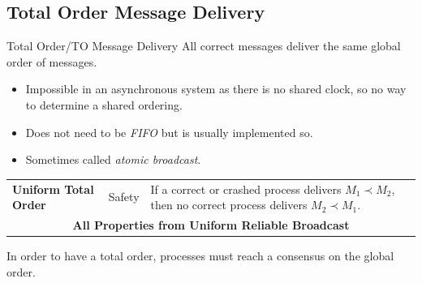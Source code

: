 \inputminted{elixir}{broadcast/code/causal_reliable_broadcast_vector_clock.ex}

\subsection{Total Order Message Delivery}
\begin{definitionbox}{Total Order/TO Message Delivery}
    All correct messages deliver the same global order of messages.
    \begin{itemize}
        \item Impossible in an asynchronous system as there is no shared clock, so no way to determine a shared ordering. 
        \item Does not need to be \textit{FIFO} but is usually implemented so.
        \item Sometimes called \textit{atomic broadcast}.
    \end{itemize}
    \begin{center}
        \begin{tabular}{l l p{}}
            \textbf{Uniform Total Order} & Safety & If a correct or crashed process delivers $M_1 \prec M_2$, then no correct process delivers $M_2 \prec M_1$. \\
            \multicolumn{3}{c}{\textbf{All Properties from Uniform Reliable Broadcast}} \\
        \end{tabular}
    \end{center}
    In order to have a total order, processes must reach a consensus on the global order.
\end{definitionbox}
